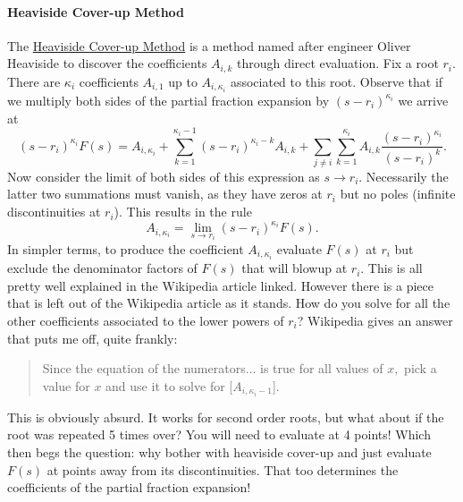 \paragraph{Heaviside Cover-up Method}
The \href{https://en.wikipedia.org/wiki/Heaviside_cover-up_method}{Heaviside Cover-up Method} is a method named after engineer Oliver Heaviside to discover the coefficients \(A_{i, k}\) through direct evaluation.
Fix a root \(r_i.\)
There are \(\kappa_i\) coefficients \(A_{i, 1}\) up to \(A_{i, \kappa_i}\) associated to this root.
Observe that if we multiply both sides of the partial fraction expansion by \((s - r_i)^{\kappa_i}\) we arrive at
\[
  (s - r_i)^{\kappa_i} F(s)
    =
    A_{i, \kappa_i}
    +
    \sum_{k=1}^{\kappa_i - 1} (s - r_i)^{\kappa_i - k} A_{i, k}
    +
    \sum_{j\neq i} \sum_{k = 1}^{\kappa_i} A_{i, k} \frac{(s - r_i)^{\kappa_i}}{(s - r_i)^k}.
\]
Now consider the limit of both sides of this expression as \(s\to r_i.\)
Necessarily the latter two summations must vanish, as they have zeros at \(r_i\) but no poles (infinite discontinuities at \(r_i\)).
This results in the rule
\[
  A_{i, \kappa_i} = \lim_{s \to r_i} (s - r_i)^{\kappa_i} F(s).
\]
In simpler terms, to produce the coefficient \(A_{i, \kappa_i}\) evaluate \(F(s)\) at \(r_i\) but exclude the denominator factors of \(F(s)\) that will blowup at \(r_i.\)
This is all pretty well explained in the Wikipedia article linked.
However there is a piece that is left out of the Wikipedia article as it stands.
How do you solve for all the other coefficients associated to the lower powers of \(r_i\)?
Wikipedia gives an answer that puts me off, quite frankly:
\begin{quote}
  Since the equation of the numerators... is true for all values of \(x,\) pick a value for \(x\) and use it to solve for [\(A_{i, \kappa_i - 1}\)].
\end{quote}
This is obviously absurd. 
It works for second order roots, but what about if the root was repeated 5 times over?
You will need to evaluate at 4 points!
Which then begs the question: why bother with heaviside cover-up and just evaluate \(F(s)\) at points away from its discontinuities.
That too determines the coefficients of the partial fraction expansion!

